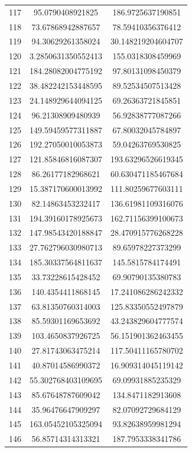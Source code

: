\documentclass[a4paper,12pt,twoside,openany]{report}
\begin{document}
\begin{longtable}{*{3}{c}}
117	& 95.0790408921825	& 186.9725637190851	\\
118	& 73.67868942887657	& 78.59410356376412	\\
119	& 94.30629261358024	& 30.148219204604707	\\
120	& 3.2850631350552413	& 155.0318308459969	\\
121	& 184.28082004775192	& 97.80131098450379	\\
122	& 38.482242153448595	& 89.52534507513428	\\
123	& 24.148929644094125	& 69.26363721845851	\\
124	& 96.21308909480939	& 56.92838777087266	\\
125	& 149.59459577311887	& 67.80032045784897	\\
126	& 192.27050010053873	& 59.04263769530825	\\
127	& 121.85846816087307	& 193.63296526619345	\\
128	& 86.26177182968621	& 60.630471185467684	\\
129	& 15.387170600013992	& 111.80259677603111	\\
130	& 82.14863453232417	& 136.61981109316076	\\
131	& 194.39160178925673	& 162.71156399100673	\\
132	& 147.98543420188847	& 28.470915776268228	\\
133	& 27.762796030980713	& 89.65978227373299	\\
134	& 185.30337564811637	& 145.5815784174491	\\
135	& 33.73228615428452	& 69.90790135380783	\\
136	& 140.4354411868145	& 17.241086286242332	\\
137	& 63.81350760314003	& 125.83350552497879	\\
138	& 85.59301169653692	& 43.243829604777574	\\
139	& 103.4650837926725	& 56.151901362463455	\\
140	& 27.81743063475214	& 117.50411165780702	\\
141	& 40.87014586990372	& 16.909314045119142	\\
142	& 55.302768403109695	& 69.09931885235329	\\
143	& 85.67648787609042	& 134.8471182913608	\\
144	& 35.96476647909297	& 82.07092729684129	\\
145	& 163.05452105325094	& 93.82638959981294	\\
146	& 56.85714314313321	& 187.7953338341786	\\

\end{longtable}
\end{document}
